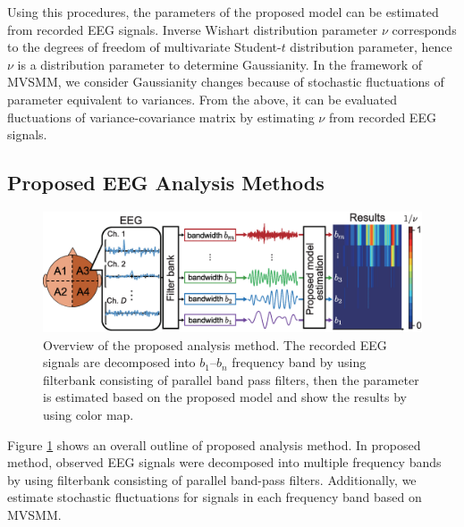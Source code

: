 \documentclass[journal]{IEEEtran}
\begin{document}
Using this procedures, the parameters of the proposed model can be estimated from recorded EEG signals.
Inverse Wishart distribution parameter $\nu$ corresponds to the degrees of freedom of multivariate Student-$t$ distribution parameter, hence $\nu$ is a distribution parameter to determine Gaussianity.
In the framework of MVSMM, we consider Gaussianity changes because of stochastic fluctuations of parameter equivalent to variances.
From the above, it can be evaluated fluctuations of variance-covariance matrix by estimating $\nu$ from recorded EEG signals.

\subsection{Proposed EEG Analysis Methods}
\begin{figure}[!ht]
\centering
\includegraphics[width=0.95\hsize]{figure/system_3.eps}
\caption{Overview of the proposed analysis method. The recorded EEG signals are decomposed into $b_1$--$b_n$ frequency band by using filterbank consisting of parallel band pass filters, then the parameter is estimated based on the proposed model and show the results by using color map.}
\label{fig:system}
\end{figure}
Figure \ref{fig:system} shows an overall outline of proposed analysis method. In proposed method, observed EEG signals were decomposed into multiple frequency bands by using filterbank consisting of parallel band-pass filters. Additionally, we estimate stochastic fluctuations for signals in each frequency band based on MVSMM.
\end{document}
